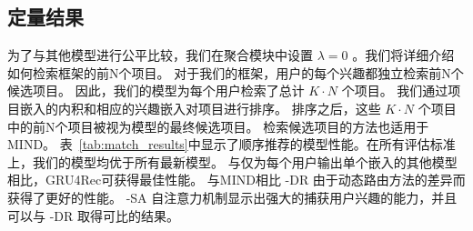\subsection{定量结果}
为了与其他模型进行公平比较，我们在聚合模块中设置 $\lambda=0$ 。我们将详细介绍如何检索框架的前N个项目。 对于我们的框架，用户的每个兴趣都独立检索前N个候选项目。 因此，我们的模型为每个用户检索了总计 $K\cdot N$ 个项目。 我们通过项目嵌入的内积和相应的兴趣嵌入对项目进行排序。 排序之后，这些 $K\cdot N$ 个项目中的前N个项目被视为模型的最终候选项目。 检索候选项目的方法也适用于MIND。
表~\ref{tab:match_results}中显示了顺序推荐的模型性能。在所有评估标准上，我们的模型均优于所有最新模型。 与仅为每个用户输出单个嵌入的其他模型相比，GRU4Rec可获得最佳性能。 与MIND相比 \model-DR 由于动态路由方法的差异而获得了更好的性能。 \model-SA 自注意力机制显示出强大的捕获用户兴趣的能力，并且可以与 \model-DR 取得可比的结果。



